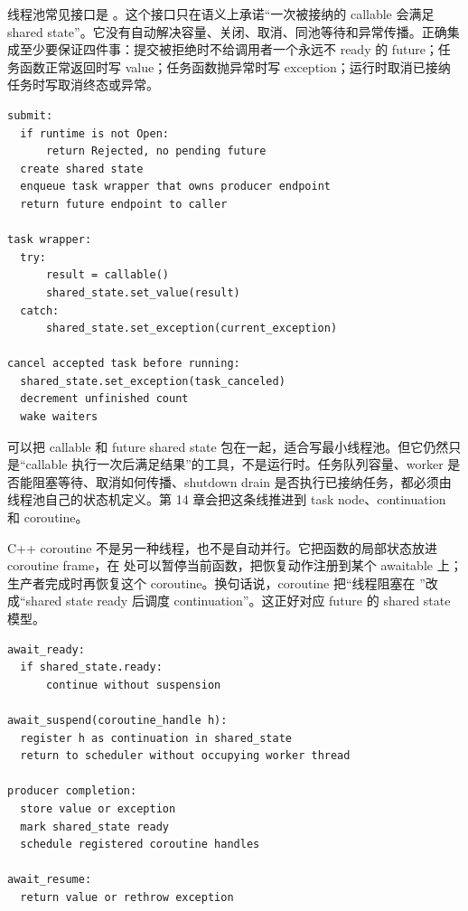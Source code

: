 线程池常见接口是 。这个接口只在语义上承诺“一次被接纳的 callable 会满足 shared state”。它没有自动解决容量、关闭、取消、同池等待和异常传播。正确集成至少要保证四件事：提交被拒绝时不给调用者一个永远不 ready 的 future；任务函数正常返回时写 value；任务函数抛异常时写 exception；运行时取消已接纳任务时写取消终态或异常。

\begin{lstlisting}[numbers=none,caption={submit 返回 future 的最低合同}]
submit:
  if runtime is not Open:
      return Rejected, no pending future
  create shared state
  enqueue task wrapper that owns producer endpoint
  return future endpoint to caller

task wrapper:
  try:
      result = callable()
      shared_state.set_value(result)
  catch:
      shared_state.set_exception(current_exception)

cancel accepted task before running:
  shared_state.set_exception(task_canceled)
  decrement unfinished count
  wake waiters
\end{lstlisting}

 可以把 callable 和 future shared state 包在一起，适合写最小线程池。但它仍然只是“callable 执行一次后满足结果”的工具，不是运行时。任务队列容量、worker 是否能阻塞等待、取消如何传播、shutdown drain 是否执行已接纳任务，都必须由线程池自己的状态机定义。第 14 章会把这条线推进到 task node、continuation 和 coroutine。

C++ coroutine 不是另一种线程，也不是自动并行。它把函数的局部状态放进 coroutine frame，在  处可以暂停当前函数，把恢复动作注册到某个 awaitable 上；生产者完成时再恢复这个 coroutine。换句话说，coroutine 把“线程阻塞在 ”改成“shared state ready 后调度 continuation”。这正好对应 future 的 shared state 模型。

\begin{lstlisting}[numbers=none,caption={co\_await future-like 状态的语义}]
await_ready:
  if shared_state.ready:
      continue without suspension

await_suspend(coroutine_handle h):
  register h as continuation in shared_state
  return to scheduler without occupying worker thread

producer completion:
  store value or exception
  mark shared_state ready
  schedule registered coroutine handles

await_resume:
  return value or rethrow exception
\end{lstlisting}

